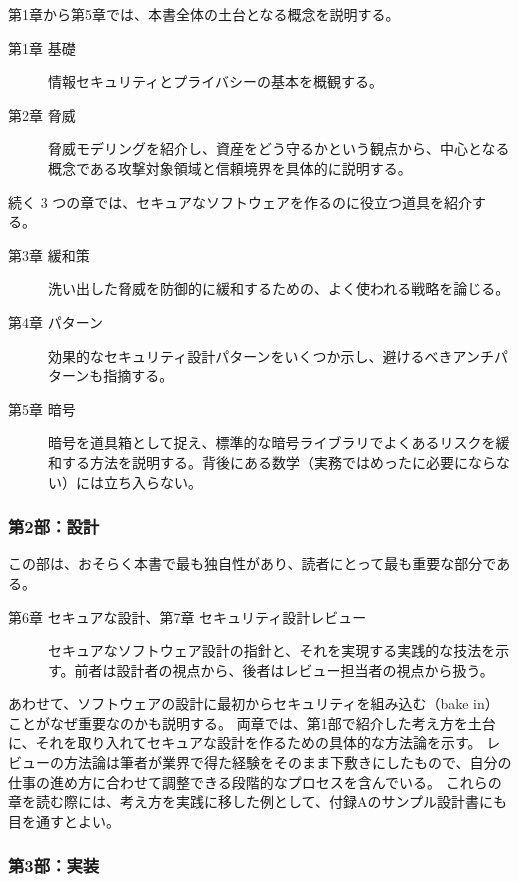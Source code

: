 \documentclass[uplatex]{jsarticle}
\begin{document}
第1章から第5章では、本書全体の土台となる概念を説明する。
\begin{description}
  \item[第1章 基礎] 情報セキュリティとプライバシーの基本を概観する。
  \item[第2章 脅威] 脅威モデリングを紹介し、資産をどう守るかという観点から、中心となる概念である攻撃対象領域と信頼境界を具体的に説明する。
\end{description}
続く 3 つの章では、セキュアなソフトウェアを作るのに役立つ道具を紹介する。
\begin{description}
  \item[第3章 緩和策] 洗い出した脅威を防御的に緩和するための、よく使われる戦略を論じる。
  \item[第4章 パターン] 効果的なセキュリティ設計パターンをいくつか示し、避けるべきアンチパターンも指摘する。
  \item[第5章 暗号] 暗号を道具箱として捉え、標準的な暗号ライブラリでよくあるリスクを緩和する方法を説明する。背後にある数学（実務ではめったに必要にならない）には立ち入らない。
\end{description}

\subsubsection*{第2部：設計}

この部は、おそらく本書で最も独自性があり、読者にとって最も重要な部分である。
\begin{description}
  \item[第6章 セキュアな設計、第7章 セキュリティ設計レビュー] セキュアなソフトウェア設計の指針と、それを実現する実践的な技法を示す。前者は設計者の視点から、後者はレビュー担当者の視点から扱う。
\end{description}
あわせて、ソフトウェアの設計に最初からセキュリティを組み込む（bake in）ことがなぜ重要なのかも説明する。
両章では、第1部で紹介した考え方を土台に、それを取り入れてセキュアな設計を作るための具体的な方法論を示す。
レビューの方法論は筆者が業界で得た経験をそのまま下敷きにしたもので、自分の仕事の進め方に合わせて調整できる段階的なプロセスを含んでいる。
これらの章を読む際には、考え方を実践に移した例として、付録Aのサンプル設計書にも目を通すとよい。

\subsubsection*{第3部：実装}
\end{document}
